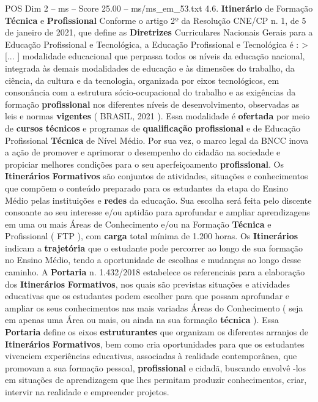 \begin{textsample}{POS Dim 2 – ms – Score 25.00 – ms/ms\_em\_53.txt}  \label{ex:f2_pos_043}
4.6. \textbf{Itinerário} de Formação \textbf{Técnica} e \textbf{Profissional} Conforme o artigo 2º da Resolução CNE/CP n. 1, de 5 de janeiro de 2021, que define as \textbf{Diretrizes} Curriculares Nacionais Gerais para a Educação Profissional e Tecnológica, a Educação Profissional e Tecnológica é : > [... ] modalidade educacional que perpassa todos os níveis da educação nacional, integrada às demais modalidades de educação e às dimensões do trabalho, da ciência, da cultura e da tecnologia, organizada por eixos tecnológicos, em consonância com a estrutura sócio-ocupacional do trabalho e as exigências da formação \textbf{profissional} nos diferentes níveis de desenvolvimento, observadas as leis e normas \textbf{vigentes} ( BRASIL, 2021 ).
Essa modalidade é \textbf{ofertada} por meio de \textbf{cursos} \textbf{técnicos} e programas de \textbf{qualificação} \textbf{profissional} e de Educação Profissional \textbf{Técnica} de Nível Médio.
Por sua vez, o marco legal da BNCC inova a ação de promover e aprimorar o desempenho do cidadão na sociedade e propiciar melhores condições para o seu aperfeiçoamento \textbf{profissional}.
Os \textbf{Itinerários} \textbf{Formativos} são conjuntos de atividades, situações e conhecimentos que compõem o conteúdo preparado para os estudantes da etapa do Ensino Médio pelas instituições e \textbf{redes} da educação.
Sua escolha será feita pelo discente consoante ao seu interesse e/ou aptidão para aprofundar e ampliar aprendizagens em uma ou mais Áreas de Conhecimento e/ou na Formação \textbf{Técnica} e Profissional ( FTP ), com \textbf{carga} total mínima de 1.200 horas.
Os \textbf{Itinerários} indicam a \textbf{trajetória} que o estudante pode percorrer ao longo de sua formação no Ensino Médio, tendo a oportunidade de escolhas e mudanças ao longo desse caminho.
A \textbf{Portaria} n. 1.432/2018 estabelece os referenciais para a elaboração dos \textbf{Itinerários} \textbf{Formativos}, nos quais são previstas situações e atividades educativas que os estudantes podem escolher para que possam aprofundar e ampliar os seus conhecimentos nas mais variadas Áreas do Conhecimento ( seja em apenas uma Área ou mais, ou ainda na sua formação \textbf{técnica} ).
Essa \textbf{Portaria} define os eixos \textbf{estruturantes} que organizam os diferentes arranjos de \textbf{Itinerários} \textbf{Formativos}, bem como cria oportunidades para que os estudantes vivenciem experiências educativas, associadas à realidade contemporânea, que promovam a sua formação pessoal, \textbf{profissional} e cidadã, buscando envolvê -los em situações de aprendizagem que lhes permitam produzir conhecimentos, criar, intervir na realidade e empreender projetos.

\end{textsample}
